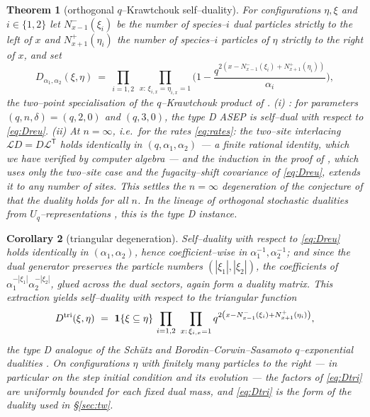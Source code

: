 \documentclass[11pt]{article}
\theoremstyle{plain}
\newtheorem{theorem}{Theorem}[section]
\newtheorem{corollary}[theorem]{Corollary}
\theoremstyle{definition}
\theoremstyle{remark}
\newcommand{\cL}{\mathcal L}\newcommand{\cO}{\mathcal O}\newcommand{\cE}{\mathcal E}
\begin{document}
\begin{theorem}[orthogonal $q$--Krawtchouk self--duality]\label{thm:dual}
For configurations $\eta,\xi$ and $i\in\{1,2\}$ let $N^-_{x-1}(\xi_i)$ be the number
of species--$i$ dual particles strictly to the left of $x$ and $N^+_{x+1}(\eta_i)$
the number of species--$i$ particles of $\eta$ strictly to the right of $x$, and set
\begin{equation}\label{eq:Dreu}
  D_{\alpha_1,\alpha_2}(\xi,\eta)\ =\ \prod_{i=1,2}\ \prod_{x:\,\xi_{i,x}=\eta_{i,x}=1}
  \Big(1-\frac{q^{2\left(x-N^-_{x-1}(\xi_i)+N^+_{x+1}(\eta_i)\right)}}{\alpha_i}\Big),
\end{equation}
the two--point specialisation of the $q$--Krawtchouk product of
\cite[Thm.~3.1]{REU}.
\textup{(i)} \cite[Thm.~3.1]{REU}: for parameters $(q,n,\delta)=(q,2,0)$ and
$(q,3,0)$, the type D ASEP is self--dual with respect to \eqref{eq:Dreu}.
\textup{(ii)} At $n=\infty$, i.e.\ for the rates \eqref{eq:rates}: the two--site
interlacing $\cL D=D\cL^{\mathsf T}$ holds identically in $(q,\alpha_1,\alpha_2)$ ---
a finite rational identity, which we have verified by computer algebra --- and the
induction in the proof of \cite[Thm.~3.1, eqs.~(16)--(19)]{REU}, which uses only the
two--site case and the fugacity--shift covariance of \eqref{eq:Dreu}, extends it to
any number of sites. This settles the $n=\infty$ degeneration of the conjecture of
\cite[Rmk.~4]{REU} that the duality holds for all $n$. In the lineage of orthogonal
stochastic dualities from $U_q$--representations \cite{Groenevelt,CGRS}, this is the
type D instance.
\end{theorem}

\begin{corollary}[triangular degeneration]\label{cor:tri}
Self--duality with respect to \eqref{eq:Dreu} holds identically in
$(\alpha_1,\alpha_2)$, hence coefficient--wise in $\alpha_1^{-1},\alpha_2^{-1}$; and
since the dual generator preserves the particle numbers $(|\xi_1|,|\xi_2|)$, the
coefficients of $\alpha_1^{-|\xi_1|}\alpha_2^{-|\xi_2|}$, glued across the dual
sectors, again form a duality matrix. This extraction yields self--duality with
respect to the \emph{triangular} function
\begin{equation}\label{eq:Dtri}
  D^{\mathrm{tri}}(\xi,\eta)\ =\ \mathbf 1\{\xi\subseteq\eta\}\,
  \prod_{i=1,2}\ \prod_{x:\,\xi_{i,x}=1}
  q^{2\left(x-N^-_{x-1}(\xi_i)+N^+_{x+1}(\eta_i)\right)},
\end{equation}
the type D analogue of the Sch\"utz and Borodin--Corwin--Sasamoto $q$--exponential
dualities \cite{Schutz,BCS}. On configurations $\eta$ with finitely many particles to
the right --- in particular on the step initial condition and its evolution --- the
factors of \eqref{eq:Dtri} are uniformly bounded for each fixed dual mass, and
\eqref{eq:Dtri} is the form of the duality used in \S\ref{sec:tw}.
\end{corollary}
\end{document}
